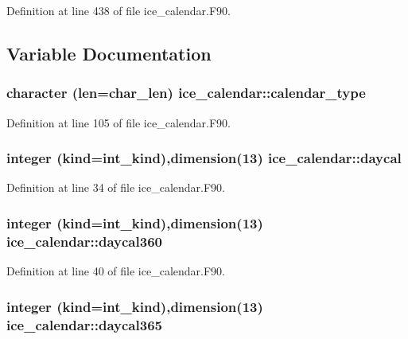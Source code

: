 Definition at line 438 of file ice\_\-calendar.F90.

\subsection{Variable Documentation}
\hypertarget{namespaceice__calendar_ad01a9ecbaab3997c0252754dee9aa0c7}{
\subsubsection[{calendar\_\-type}]{\setlength{\rightskip}{0pt plus 5cm}character (len=char\_\-len) {\bf ice\_\-calendar::calendar\_\-type}}}
\label{namespaceice__calendar_ad01a9ecbaab3997c0252754dee9aa0c7}


Definition at line 105 of file ice\_\-calendar.F90.\hypertarget{namespaceice__calendar_ab55e85b8212a213de225f16289d5bb75}{
\subsubsection[{daycal}]{\setlength{\rightskip}{0pt plus 5cm}integer (kind=int\_\-kind),dimension(13) {\bf ice\_\-calendar::daycal}}}
\label{namespaceice__calendar_ab55e85b8212a213de225f16289d5bb75}


Definition at line 34 of file ice\_\-calendar.F90.\hypertarget{namespaceice__calendar_ad91c534442e93775fa9630bdaa9da806}{
\subsubsection[{daycal360}]{\setlength{\rightskip}{0pt plus 5cm}integer (kind=int\_\-kind),dimension(13) {\bf ice\_\-calendar::daycal360}}}
\label{namespaceice__calendar_ad91c534442e93775fa9630bdaa9da806}


Definition at line 40 of file ice\_\-calendar.F90.\hypertarget{namespaceice__calendar_a080909b268176fb29d513a184cc30386}{
\subsubsection[{daycal365}]{\setlength{\rightskip}{0pt plus 5cm}integer (kind=int\_\-kind),dimension(13) {\bf ice\_\-calendar::daycal365}}}
\label{namespaceice__calendar_a080909b268176fb29d513a184cc30386}


